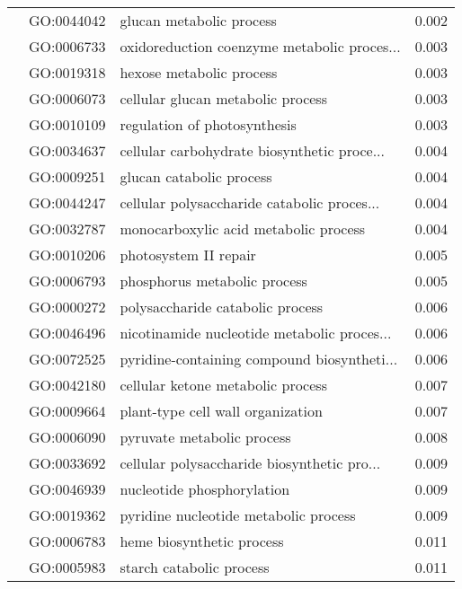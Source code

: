 \begin{longtable}{lllr}
   & GO:0044042 &                     glucan metabolic process &         0.002 \\
   & GO:0006733 &  oxidoreduction coenzyme metabolic proces... &         0.003 \\
   & GO:0019318 &                     hexose metabolic process &         0.003 \\
   & GO:0006073 &            cellular glucan metabolic process &         0.003 \\
   & GO:0010109 &                 regulation of photosynthesis &         0.003 \\
   & GO:0034637 &  cellular carbohydrate biosynthetic proce... &         0.004 \\
   & GO:0009251 &                     glucan catabolic process &         0.004 \\
   & GO:0044247 &  cellular polysaccharide catabolic proces... &         0.004 \\
   & GO:0032787 &        monocarboxylic acid metabolic process &         0.004 \\
   & GO:0010206 &                        photosystem II repair &         0.005 \\
   & GO:0006793 &                 phosphorus metabolic process &         0.005 \\
   & GO:0000272 &             polysaccharide catabolic process &         0.006 \\
   & GO:0046496 &  nicotinamide nucleotide metabolic proces... &         0.006 \\
   & GO:0072525 &  pyridine-containing compound biosyntheti... &         0.006 \\
   & GO:0042180 &            cellular ketone metabolic process &         0.007 \\
   & GO:0009664 &            plant-type cell wall organization &         0.007 \\
   & GO:0006090 &                   pyruvate metabolic process &         0.008 \\
   & GO:0033692 &  cellular polysaccharide biosynthetic pro... &         0.009 \\
   & GO:0046939 &                   nucleotide phosphorylation &         0.009 \\
   & GO:0019362 &        pyridine nucleotide metabolic process &         0.009 \\
   & GO:0006783 &                    heme biosynthetic process &         0.011 \\
   & GO:0005983 &                     starch catabolic process &         0.011 \\

\end{longtable}
